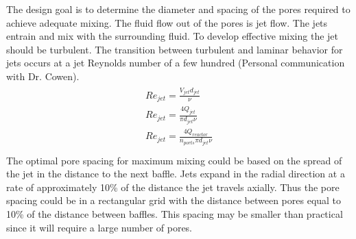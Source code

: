 \documentclass[letterpaper,10pt,english]{sphinxmanual}
\begin{document}
The design goal is to determine the diameter and spacing of the pores required to achieve adequate mixing. The fluid flow out of the pores is jet flow. The jets entrain and mix with the surrounding fluid. To develop effective mixing the jet should be turbulent. The transition between turbulent and laminar behavior for jets occurs at a jet Reynolds number of a few hundred (Personal communication with Dr. Cowen).
\begin{align}\label{equation:Reactor_Characteristics/Reactor_Characteristics:Reactor_Characteristics/Reactor_Characteristics:14}\!\begin{aligned}
Re_{jet} =\frac{V_{jet} d_{jet} }{\nu }\\
Re_{jet} =\frac{4Q_{jet} }{\pi d_{jet} \nu }\\
Re_{jet} =\frac{4Q_{reactor} }{n_{ports} \pi d_{jet} \nu }\\
\end{aligned}\end{align}
The optimal pore spacing for maximum mixing could be based on the spread of the jet in the distance to the next baffle.  Jets expand in the radial direction at a rate of approximately 10\% of the distance the jet travels axially. Thus the pore spacing could be in a rectangular grid with the distance between pores equal to 10\% of the distance between baffles. This spacing may be smaller than practical since it will require a large number of pores.
\end{document}
